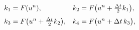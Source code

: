 \documentclass[preview]{standalone}
\begin{document}
\begin{align*}
\special{dvisvgm:raw <g id='unique000'>}\begin{aligned}
            k_1 &= F(u^n), & k_2 &= F\big(u^n+\tfrac{\Delta t}{2}k_1\big),\\[3pt]
            k_3 &= F\big(u^n+\tfrac{\Delta t}{2}k_2\big), & k_4 &= F\big(u^n+\Delta t\,k_3\big),
            \end{aligned}\special{dvisvgm:raw </g>}
\end{align*}
\end{document}
